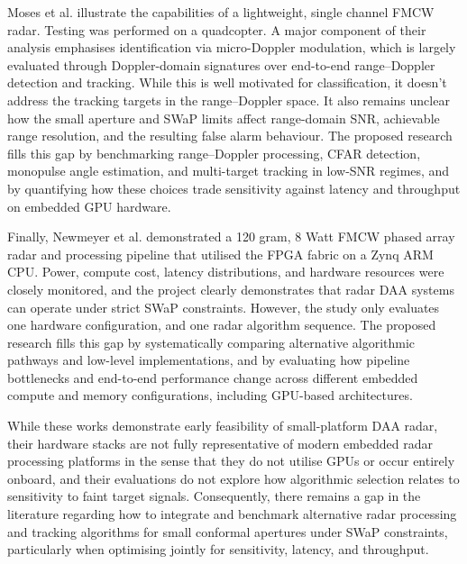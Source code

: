 Moses et al. illustrate the capabilities of a lightweight, single channel FMCW radar. Testing was performed on a quadcopter. A major component of their analysis emphasises identification via micro-Doppler modulation, which is largely evaluated through Doppler-domain signatures over end-to-end range--Doppler detection and tracking. While this is well motivated for classification, it doesn't address the tracking targets in the  range--Doppler space. It also remains unclear how the small aperture and SWaP limits affect range-domain SNR, achievable range resolution, and the resulting false alarm behaviour. The proposed research fills this gap by benchmarking range--Doppler processing, CFAR detection, monopulse angle estimation, and multi-target tracking in low-SNR regimes, and by quantifying how these choices trade sensitivity against latency and throughput on embedded GPU hardware. 

Finally, Newmeyer et al. demonstrated a 120 gram, 8 Watt FMCW phased array radar and processing pipeline that utilised the FPGA fabric on a Zynq ARM CPU. Power, compute cost, latency distributions, and hardware resources were closely monitored, and the project clearly demonstrates that radar DAA systems can operate under strict SWaP constraints. However, the study only evaluates one hardware configuration, and one radar algorithm sequence. The proposed research fills this gap by systematically comparing alternative algorithmic pathways and low-level implementations, and by evaluating how pipeline bottlenecks and end-to-end performance change across different embedded compute and memory configurations, including GPU-based architectures. 

While these works demonstrate early feasibility of small-platform DAA radar, their hardware stacks are not fully representative of modern embedded radar processing platforms in the sense that they do not utilise GPUs or occur entirely onboard, and their evaluations do not explore how algorithmic selection relates to sensitivity to faint target signals. Consequently, there remains a gap in the literature regarding how to integrate and benchmark alternative radar processing and tracking algorithms for small conformal apertures under SWaP constraints, particularly when optimising jointly for sensitivity, latency, and throughput. 
